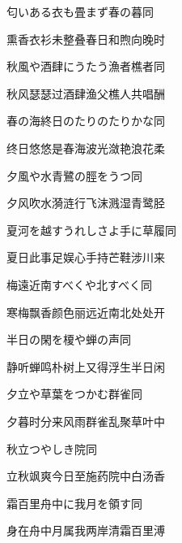\begin{haiku}
    {\FH 匂いある衣も畳まず春の暮}\hfill{\FH 同}

    {\FK 熏香衣衫未整叠春日和煦向晚时}
\end{haiku}

\begin{haiku}
    {\FH 秋風や酒肆にうたう漁者樵者}\hfill{\FH 同}

    {\FK 秋风瑟瑟过酒肆渔父樵人共唱酬}
\end{haiku}

\begin{haiku}
    {\FH 春の海終日のたりのたりかな}\hfill{\FH 同}

    {\FK 终日悠悠是春海波光潋艳浪花柔}
\end{haiku}

\begin{haiku}
    {\FH 夕風や水青鷺の脛をうつ}\hfill{\FH 同}

    {\FK 夕风吹水漪涟行飞沫溅湿青鹭胫}
\end{haiku}

\begin{haiku}
    {\FH 夏河を越すうれしさよ手に草履}\hfill{\FH 同}

    {\FK 夏日此事足娱心手持芒鞋涉川来}
\end{haiku}

\begin{haiku}
    {\FH 梅遠近南すべくや北すべく}\hfill{\FH 同}

    {\FK 寒梅飘香颜色丽远近南北处处开}
\end{haiku}

\begin{haiku}
    {\FH 半日の閑を榎や蝉の声}\hfill{\FH 同}

    {\FK 静听蝉鸣朴树上又得浮生半日闲}
\end{haiku}

\begin{haiku}
    {\FH 夕立や草葉をつかむ群雀}\hfill{\FH 同}

    {\FK 夕暮时分来风雨群雀乱聚草叶中}
\end{haiku}

\begin{haiku}
    {\FH 秋立つやしき院}\hfill{\FH 同}

    {\FK 立秋飒爽今日至施药院中白汤香}
\end{haiku}

\begin{haiku}
    {\FH 霜百里舟中に我月を領す}\hfill{\FH 同}

    {\FK 身在舟中月属我两岸清霜百里溥}
\end{haiku}

